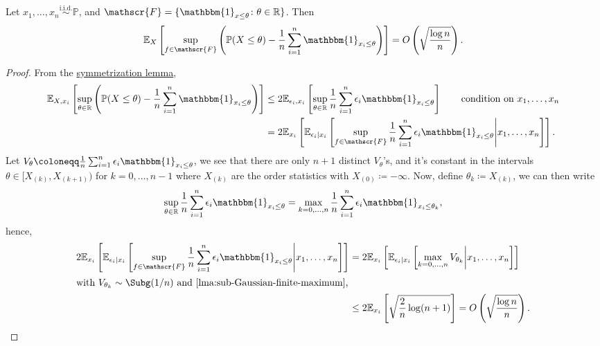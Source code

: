 \begin{proposition}\label{prop:symmetrization}
	Let \(x_1, \dots , x_n \overset{\text{i.i.d.} }{\sim } \mathbb{P} \), and \(\mathscr{F} = \{ \mathbbm{1}_{x \leq \theta} \colon \theta \in \mathbb{R} \} \). Then
	\[
		\mathbb{E}_{X}\left[ \sup _{f\in \mathscr{F} } \left( \mathbb{P} (X \leq \theta ) - \frac{1}{n}\sum_{i=1}^{n} \mathbbm{1}_{x_i \leq \theta } \right) \right] = O\left( \sqrt{\frac{\log n}{n}}  \right).
	\]
\end{proposition}
\begin{proof}
	From the \hyperref[lma:symmetrization]{symmetrization lemma},
	\begin{align*}
		\mathbb{E}_{X, x_i}\left[\sup _{\theta \in \mathbb{R} } \left( \mathbb{P} (X \leq \theta ) - \frac{1}{n} \sum_{i=1}^{n} \mathbbm{1}_{x_i \leq \theta } \right) \right]
		 & \leq 2 \mathbb{E}_{\epsilon _i, x_i}\left[\sup _{\theta \in \mathbb{R} } \frac{1}{n}\sum_{i=1}^{n} \epsilon _i \mathbbm{1}_{x_i \leq \theta } \right]\tag*{condition on \(x_1, \dots , x_n\)}                   \\
		 & = 2 \mathbb{E}_{x_i}\left[ \mathbb{E}_{\epsilon _i \mid x_i}\left[ \sup _{f\in \mathscr{F} } \frac{1}{n} \sum_{i=1}^{n} \epsilon _i \mathbbm{1}_{x_i \leq \theta } \middle| x_1, \dots , x_n \right]  \right] .
	\end{align*}
	Let \(V_\theta \coloneqq \frac{1}{n}\sum_{i=1}^{n} \epsilon _i \mathbbm{1}_{x_i \leq \theta } \), we see that there are only \(n+1\) distinct \(V_\theta \)'s, and it's constant in the intervals \(\theta \in [X_{(k)}, X_{(k+1)})\) for \(k = 0, \dots , n-1\) where \(X_{(k)}\) are the order statistics with \(X_{(0)} \coloneqq -\infty \). Now, define \(\theta _k \coloneqq X_{(k)}\), we can then write
	\[
		\sup _{\theta \in \mathbb{R} }\frac{1}{n} \sum_{i=1}^{n} \epsilon _i \mathbbm{1}_{x_i \leq \theta }
		= \max _{k=0, \dots , n} \frac{1}{n}\sum_{i=1}^{n} \epsilon _i \mathbbm{1}_{x_i \leq \theta _k},
	\]
	hence,
	\begin{align*}
		2 \mathbb{E}_{x_i}\left[ \mathbb{E}_{\epsilon _i \mid x_i}\left[ \sup _{f\in \mathscr{F} } \frac{1}{n} \sum_{i=1}^{n} \epsilon _i \mathbbm{1}_{x_i \leq \theta } \middle| x_1, \dots , x_n \right]  \right]
		 & = 2 \mathbb{E}_{x_i}\left[ \mathbb{E}_{\epsilon _i \mid x_i}\left[ \max _{k=0, \dots , n} V_{\theta _k} \middle| x_1, \dots , x_n \right]  \right] \\
		\shortintertext{with \(V_{\theta _k} \sim \Subg(1 / n) \) and \autoref{lma:sub-Gaussian-finite-maximum},}
		 & \leq 2 \mathbb{E}_{x_i}\left[ \sqrt{\frac{2}{n} \log (n+1)} \right]
		= O\left( \sqrt{\frac{\log n }{n}} \right).
	\end{align*}
\end{proof}

